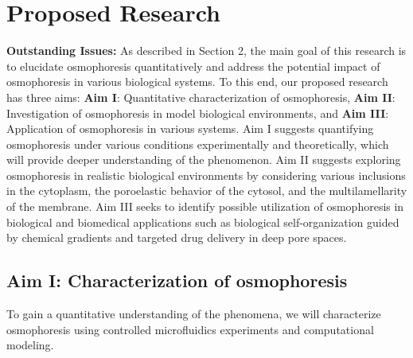 \documentclass[11pt]{article}
\begin{document}
\section{Proposed Research\label{sec:ProposedResearch}}
\noindent
{\bf Outstanding Issues:}
%
As described in Section 2, the main goal of this research is to elucidate osmophoresis quantitatively and address the potential impact of osmophoresis in various biological systems. To this end, our proposed research has three aims: \textbf{Aim I}: Quantitative characterization of osmophoresis, \textbf{Aim II}: Investigation of osmophoresis in model biological environments, and \textbf{Aim III}: Application of osmophoresis in various systems. Aim I suggests quantifying osmophoresis under various conditions experimentally and theoretically, which will provide deeper understanding of the phenomenon. Aim II suggests exploring osmophoresis in realistic biological environments by considering various inclusions in the cytoplasm, 
the poroelastic behavior of the cytosol, and the multilamellarity of the membrane. Aim III seeks to identify possible utilization of osmophoresis in biological and biomedical applications such as biological self-organization guided by chemical gradients and targeted drug delivery in deep pore spaces.

\subsection{Aim I: Characterization of osmophoresis\label{subsec:aim1}}
To gain a quantitative understanding of the phenomena, we will characterize osmophoresis using controlled microfluidics experiments 
and computational modeling.
\end{document}
